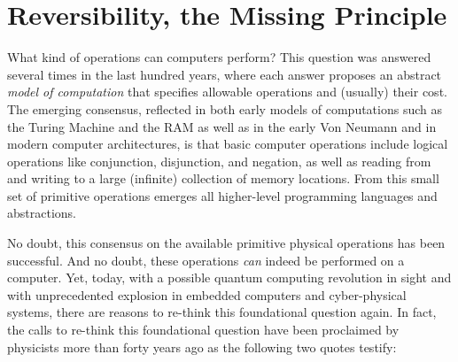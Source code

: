 \documentclass{article}
\begin{document}








\section{Reversibility, the Missing Principle}

What kind of operations can computers perform? This question was
answered several times in the last hundred years, where each answer
proposes an abstract \emph{model of computation} that specifies
allowable operations and (usually) their cost. The emerging consensus,
reflected in both early models of computations such as the Turing
Machine and the RAM as well as in the early Von Neumann and in modern
computer architectures, is that basic computer operations include
logical operations like conjunction, disjunction, and negation, as
well as reading from and writing to a large (infinite) collection of
memory locations. From this small set of primitive operations emerges
all higher-level programming languages and abstractions.

No doubt, this consensus on the available primitive physical
operations has been successful. And no doubt, these operations
\emph{can} indeed be performed on a computer. Yet, today, with a
possible quantum computing revolution in sight and with unprecedented
explosion in embedded computers and cyber-physical systems, there are
reasons to re-think this foundational question again. In fact, the
calls to re-think this foundational question have been proclaimed by
physicists more than forty years ago as the following two quotes
testify:
\end{document}

